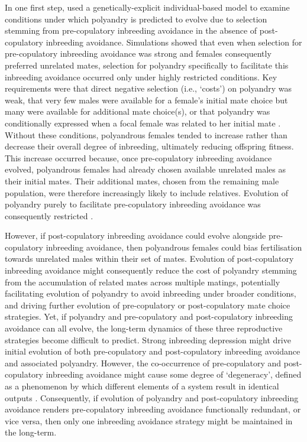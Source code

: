 \documentclass[12pt]{article}
\begin{document}
In one first step, \cite{Duthie} used a genetically-explicit individual-based model to examine conditions under which polyandry is predicted to evolve due to selection stemming from pre-copulatory inbreeding avoidance in the absence of post-copulatory inbreeding avoidance. Simulations showed that even when selection for pre-copulatory inbreeding avoidance was strong and females consequently preferred unrelated mates, selection for polyandry specifically to facilitate this inbreeding avoidance occurred only under highly restricted conditions. Key requirements were that direct negative selection (i.e., `costs') on polyandry was weak, that very few males were available for a female's initial mate choice but many were available for additional mate choice(s), or that polyandry was conditionally expressed when a focal female was related to her initial mate \cite[][]{Duthie}. Without these conditions, polyandrous females tended to increase rather than decrease their overall degree of inbreeding, ultimately reducing offspring fitness. This increase occurred because, once pre-copulatory inbreeding avoidance evolved, polyandrous females had already chosen available unrelated males as their initial mates. Their additional mates, chosen from the remaining male population, were therefore increasingly likely to include relatives. Evolution of polyandry purely to facilitate pre-copulatory inbreeding avoidance was consequently restricted \cite[][]{Duthie}. 

However, if post-copulatory inbreeding avoidance could evolve alongside pre-copulatory inbreeding avoidance, then polyandrous females could bias fertilisation towards unrelated males within their set of mates. Evolution of post-copulatory inbreeding avoidance might consequently reduce the cost of polyandry stemming from the accumulation of related mates across multiple matings, potentially facilitating evolution of polyandry to avoid inbreeding under broader conditions, and driving further evolution of pre-copulatory or post-copulatory mate choice strategies. Yet, if polyandry and pre-copulatory and post-copulatory inbreeding avoidance can all evolve, the long-term dynamics of these three reproductive strategies become difficult to predict. Strong inbreeding depression might drive initial evolution of both pre-copulatory and post-copulatory inbreeding avoidance and associated polyandry. However, the co-occurrence of pre-copulatory and post-copulatory inbreeding avoidance might cause some degree of `degeneracy', defined as a phenomenon by which different elements of a system result in identical outputs \cite[][]{Edelman2001}. Consequently, if evolution of polyandry and post-copulatory inbreeding avoidance renders pre-copulatory inbreeding avoidance functionally redundant, or vice versa, then only one inbreeding avoidance strategy might be maintained in the long-term.
\end{document}
